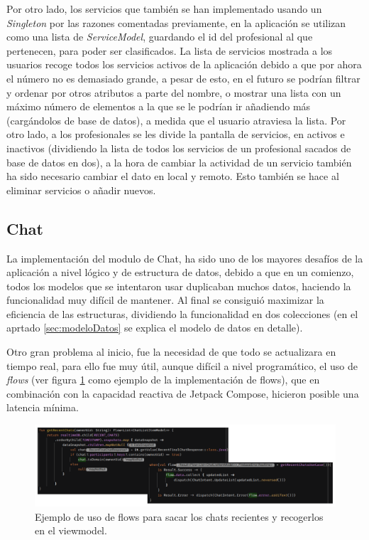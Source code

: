 Por otro lado, los servicios que también se han implementado usando un \textit{Singleton} por las razones comentadas previamente, en la aplicación se utilizan como una lista de \textit{ServiceModel}, guardando el id del profesional al que pertenecen, para poder ser clasificados. La lista de servicios mostrada a los usuarios recoge todos los servicios activos de la aplicación debido a que por ahora el número no es demasiado grande, a pesar de esto, en el futuro se podrían filtrar y ordenar por otros atributos a parte del nombre, o mostrar una lista con un máximo número de elementos a la que se le podrían ir añadiendo más (cargándolos de base de datos), a medida que el usuario atraviesa la lista. Por otro lado, a los profesionales se les divide la pantalla de servicios, en activos e inactivos (dividiendo la lista de todos los servicios de un profesional sacados de base de datos en dos), a la hora de cambiar la actividad de un servicio también ha sido necesario cambiar el dato en local y remoto. Esto también se hace al eliminar servicios o añadir nuevos.

\subsection{Chat} 
La implementación del modulo de Chat, ha sido uno de los mayores desafíos de la aplicación a nivel lógico y de estructura de datos, debido a que en un comienzo, todos los modelos que se intentaron usar duplicaban muchos datos, haciendo la funcionalidad muy difícil de mantener. Al final se consiguió maximizar la eficiencia de las estructuras, dividiendo la funcionalidad en dos colecciones (en el aprtado \ref{sec:modeloDatos} se explica el modelo de datos en detalle). 

Otro gran problema al inicio, fue la necesidad de que todo se actualizara en tiempo real, para ello fue muy útil, aunque difícil a nivel programático, el uso de \textit{flows} (ver figura \ref{fig:flows_impl} como ejemplo de la implementación de flows), que en combinación con la capacidad reactiva de Jetpack Compose, hicieron posible una latencia mínima.
\begin{figure}[h]
    \centering
    \includegraphics[width = 1\textwidth]{Imagenes/Fuentes/flows_impl2.png}
    \caption{Ejemplo de uso de flows para sacar los chats recientes y recogerlos en el viewmodel.}
    \label{fig:flows_impl}
\end{figure}

